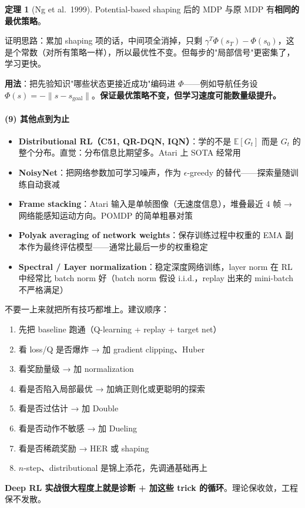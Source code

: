 \documentclass[11pt,a4paper]{article}
\theoremstyle{definition}
\newtheorem{theorem}{定理}[section]
\begin{document}
\begin{theorem}[Ng et al.\ 1999]
Potential-based shaping 后的 MDP 与原 MDP 有\textbf{相同的最优策略}。

证明思路：累加 shaping 项的话，中间项全消掉，只剩 $\gamma^T \Phi(s_T) - \Phi(s_0)$，这是个常数（对所有策略一样），所以最优性不变。但每步的"局部信号"更密集了，学习更快。
\end{theorem}

\textbf{用法}：把先验知识"哪些状态更接近成功"编码进 $\Phi$——例如导航任务设 $\Phi(s) = -\|s - s_{\text{goal}}\|$。\textbf{保证最优策略不变，但学习速度可能数量级提升。}

\paragraph{(9) 其他点到为止}

\begin{itemize}
\item \textbf{Distributional RL（C51, QR-DQN, IQN）}：学的不是 $\mathbb E[G_t]$ 而是 $G_t$ 的整个分布。直觉：分布信息比期望多。Atari 上 SOTA 经常用
\item \textbf{NoisyNet}：把网络参数加可学习噪声，作为 $\epsilon$-greedy 的替代——探索量随训练自动衰减
\item \textbf{Frame stacking}：Atari 输入是单帧图像（无速度信息），堆叠最近 4 帧 → 网络能感知运动方向。POMDP 的简单粗暴对策
\item \textbf{Polyak averaging of network weights}：保存训练过程中权重的 EMA 副本作为最终评估模型——通常比最后一步的权重稳定
\item \textbf{Spectral / Layer normalization}：稳定深度网络训练，layer norm 在 RL 中经常比 batch norm 好（batch norm 假设 i.i.d.，replay 出来的 mini-batch 不严格满足）
\end{itemize}

\begin{plainwords}[挑技巧的原则]
不要一上来就把所有技巧都堆上。建议顺序：
\begin{enumerate}
\item 先把 baseline 跑通（Q-learning + replay + target net）
\item 看 loss/Q 是否爆炸 → 加 gradient clipping、Huber
\item 看奖励量级 → 加 normalization
\item 看是否陷入局部最优 → 加熵正则化或更聪明的探索
\item 看是否过估计 → 加 Double
\item 看是否动作不敏感 → 加 Dueling
\item 看是否稀疏奖励 → HER 或 shaping
\item $n$-step、distributional 是锦上添花，先调通基础再上
\end{enumerate}

\textbf{Deep RL 实战很大程度上就是诊断 + 加这些 trick 的循环}。理论保收敛，工程保不发散。
\end{plainwords}
\end{document}
